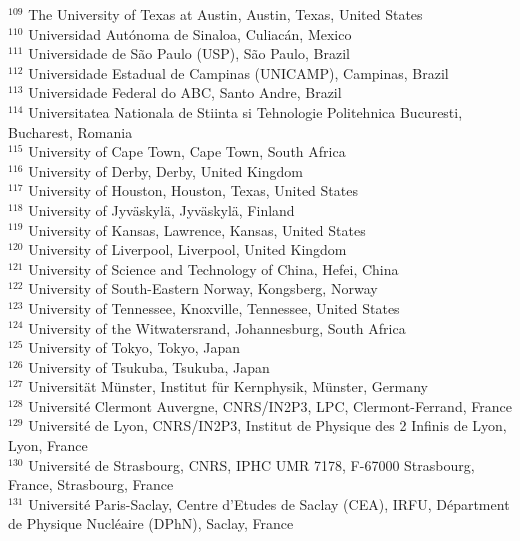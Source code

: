 \begin{flushleft}
$^{109}$ The University of Texas at Austin, Austin, Texas, United States\\
$^{110}$ Universidad Aut\'{o}noma de Sinaloa, Culiac\'{a}n, Mexico\\
$^{111}$ Universidade de S\~{a}o Paulo (USP), S\~{a}o Paulo, Brazil\\
$^{112}$ Universidade Estadual de Campinas (UNICAMP), Campinas, Brazil\\
$^{113}$ Universidade Federal do ABC, Santo Andre, Brazil\\
$^{114}$ Universitatea Nationala de Stiinta si Tehnologie Politehnica Bucuresti, Bucharest, Romania\\
$^{115}$ University of Cape Town, Cape Town, South Africa\\
$^{116}$ University of Derby, Derby, United Kingdom\\
$^{117}$ University of Houston, Houston, Texas, United States\\
$^{118}$ University of Jyv\"{a}skyl\"{a}, Jyv\"{a}skyl\"{a}, Finland\\
$^{119}$ University of Kansas, Lawrence, Kansas, United States\\
$^{120}$ University of Liverpool, Liverpool, United Kingdom\\
$^{121}$ University of Science and Technology of China, Hefei, China\\
$^{122}$ University of South-Eastern Norway, Kongsberg, Norway\\
$^{123}$ University of Tennessee, Knoxville, Tennessee, United States\\
$^{124}$ University of the Witwatersrand, Johannesburg, South Africa\\
$^{125}$ University of Tokyo, Tokyo, Japan\\
$^{126}$ University of Tsukuba, Tsukuba, Japan\\
$^{127}$ Universit\"{a}t M\"{u}nster, Institut f\"{u}r Kernphysik, M\"{u}nster, Germany\\
$^{128}$ Universit\'{e} Clermont Auvergne, CNRS/IN2P3, LPC, Clermont-Ferrand, France\\
$^{129}$ Universit\'{e} de Lyon, CNRS/IN2P3, Institut de Physique des 2 Infinis de Lyon, Lyon, France\\
$^{130}$ Universit\'{e} de Strasbourg, CNRS, IPHC UMR 7178, F-67000 Strasbourg, France, Strasbourg, France\\
$^{131}$ Universit\'{e} Paris-Saclay, Centre d'Etudes de Saclay (CEA), IRFU, D\'{e}partment de Physique Nucl\'{e}aire (DPhN), Saclay, France\\

\end{flushleft}

